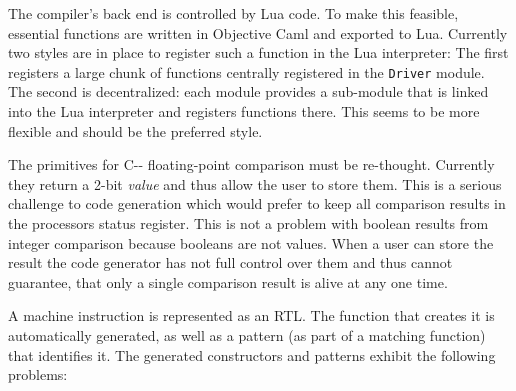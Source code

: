 \documentclass[11pt]{article}
\newcommand\PAL{{\small C-{}-}}
\newcommand\rtl{{\small RTL}}
\begin{document}
The compiler's back end is controlled by Lua code. To make this
feasible, essential functions are written in Objective Caml and exported
to Lua. Currently two styles are in place to register such a function in
the Lua interpreter: The first registers a large chunk of functions
centrally registered in the \texttt{Driver} module. The second is
decentralized: each module provides a sub-module that is linked into the
Lua interpreter and registers functions there. This seems to be more
flexible and should be the preferred style.

The primitives for {\PAL} floating-point comparison must be
re-thought. Currently they return a 2-bit \emph{value} and thus allow
the user to store them. This is a serious challenge to code generation
which would prefer to keep all comparison results in the processors
status register. This is not a problem with boolean results from integer
comparison because booleans are not values.  When a user can  store the
result the code generator has not full control over them and thus cannot
guarantee, that only a single comparison result is alive at any one
time.

A machine instruction is represented as an {\rtl}. The function
that creates it is automatically generated, as well as a pattern (as part
of a matching function) that identifies it. The generated constructors
and patterns exhibit the following problems:
\end{document}

